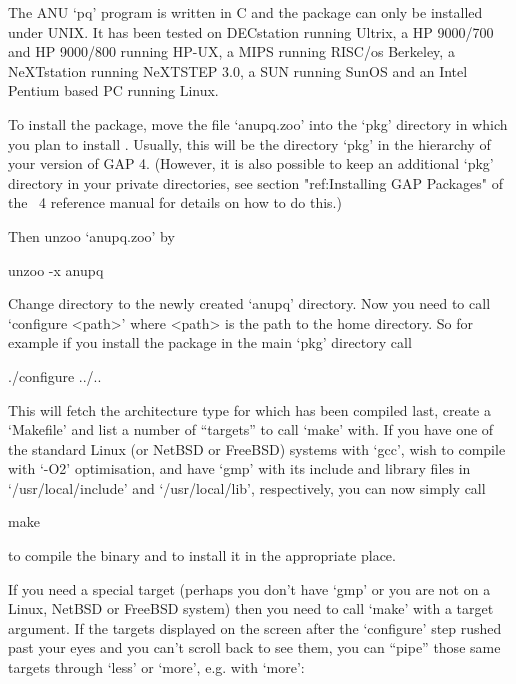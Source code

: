 

The ANU `pq' program is written in C and the package can only be installed
under UNIX. It has  been  tested  on  DECstation  running  Ultrix,  a  HP
9000/700 and HP 9000/800 running HP-UX, a MIPS running RISC/os  Berkeley,
a NeXTstation running NeXTSTEP 3.0, a SUN  running  SunOS  and  an  Intel
Pentium based PC running Linux.

To install the {\ANUPQ} package, move the file `anupq.zoo' into the `pkg'
directory in which you plan to install {\ANUPQ}. Usually,  this  will  be
the directory `pkg' in the hierarchy of your version of GAP 4.  (However,
it is also possible to keep an additional `pkg' directory in your private
directories, see section "ref:Installing GAP Packages"  of  the  {\GAP}~4
reference manual for details on how to do this.)

Then unzoo `anupq.zoo' by

\begintt
unzoo -x anupq
\endtt

Change directory to the newly created `anupq' directory. Now you need  to
call `configure <path>' where <path> is  the  path  to  the  {\GAP}  home
directory. So for example if you install the package in  the  main  `pkg'
directory call

\begintt
./configure ../..
\endtt

This will fetch the architecture type for which {\GAP} has been  compiled
last, create a `Makefile' and list a number of ``targets'' to call `make'
with. If you have one of  the  standard  Linux  (or  NetBSD  or  FreeBSD)
systems with `gcc', wish to compile with  `-O2'  optimisation,  and  have
`gmp' with its include and  library  files  in  `/usr/local/include'  and
`/usr/local/lib', respectively, you can now simply call

\begintt
make
\endtt

to compile the binary and to install it in the appropriate place.

If you need a special target (perhaps you don't have `gmp' or you are not
on a Linux, NetBSD or FreeBSD system) then you need to call `make' with a
target argument. If  the  targets  displayed  on  the  screen  after  the
`configure' step rushed past your eyes and you can't scroll back  to  see
them, you can ``pipe'' those same targets through `less' or `more',  e.g.
with `more':

